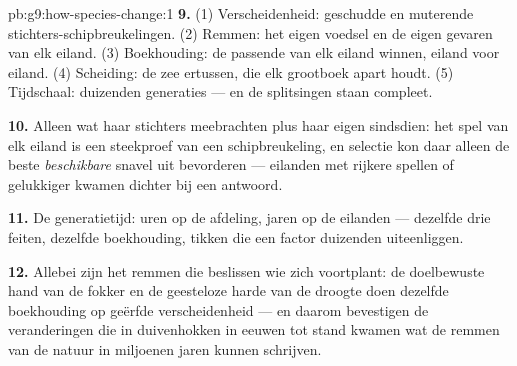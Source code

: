 \begin{solution}{pb:g9:how-species-change:1}
\textbf{9.} (1) Verscheidenheid: geschudde en muterende
stichters-schipbreukelingen. (2) Remmen: het eigen voedsel en de
eigen gevaren van elk eiland. (3) Boekhouding: de passende 
van elk eiland winnen, eiland voor eiland. (4) Scheiding: de zee
ertussen, die elk grootboek apart houdt. (5) Tijdschaal: duizenden
generaties --- en de splitsingen staan compleet.

\textbf{10.} Alleen wat haar stichters meebrachten plus haar eigen
 sindsdien: het spel van elk eiland is een steekproef van
een schipbreukeling, en selectie kon daar alleen de beste
\emph{beschikbare} snavel uit bevorderen --- eilanden met rijkere
spellen of gelukkiger  kwamen dichter bij een antwoord.

\textbf{11.} De generatietijd: uren op de afdeling, jaren op de
eilanden --- dezelfde drie feiten, dezelfde boekhouding, tikken die
een factor duizenden uiteenliggen.

\textbf{12.} Allebei zijn het remmen die beslissen wie zich
voortplant: de doelbewuste hand van de fokker en de geesteloze harde
 van de droogte doen dezelfde boekhouding op geërfde
verscheidenheid --- en daarom bevestigen de veranderingen die in
duivenhokken in eeuwen tot stand kwamen wat de remmen van de natuur
in miljoenen jaren kunnen schrijven.
\end{solution}

